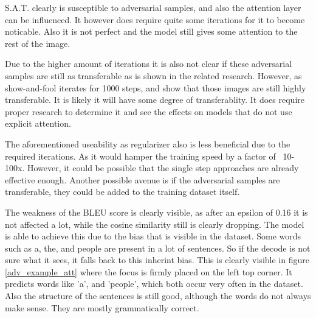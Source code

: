 S.A.T. clearly is susceptible to adversarial samples, and also the attention layer can be influenced. It however does require quite some iterations for it to become noticable. Also it is not perfect and the model still gives some attention to the rest of the image.

Due to the higher amount of iterations it is also not clear if these adversarial samples are still as transferable as is shown in the related research. However, as show-and-fool\cite{Hongge} iterates for 1000 steps, and show that those images are still highly transferable. It is likely it will have some degree of transferablity. It does require proper research to determine it and see the effects on models that do not use explicit attention.

The aforementioned useability as regularizer also is less beneficial due to the required iterations. As it would hamper the training speed by a factor of ~10-100x. However, it could be possible that the single step approaches are already effective enough. Another possible avenue is if the adversarial samples are transferable, they could be added to the training dataset itself.

The weakness of the BLEU score is clearly visible, as after an epsilon of 0.16 it is not affected a lot, while the cosine similarity still is clearly dropping. The model is able to achieve this due to the bias that is visible in the dataset. Some words such as a, the, and people are present in a lot of sentences. So if the decode is not sure what it sees, it falls back to this inherint bias. This is clearly visible in figure \ref{adv_example_att} where the focus is firmly placed on the left top corner. It predicts words like 'a', and 'people', which both occur very often in the dataset. Also the structure of the sentences is still good, although the words do not always make sense. They are mostly grammatically correct.
